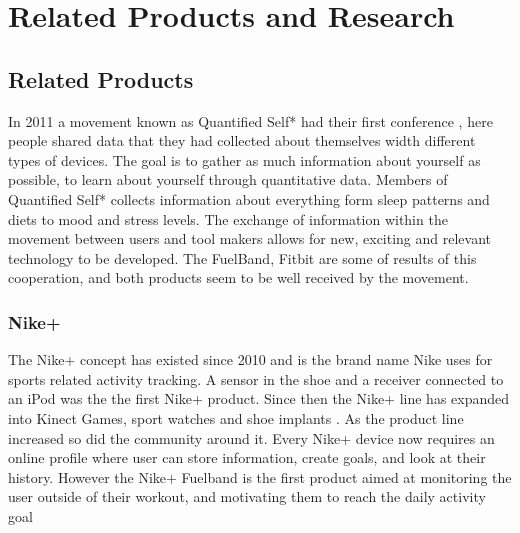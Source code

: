 \chapter{Related Products and Research} %

\label{Chapter3} %


\section{Related Products}
In 2011 a movement known as Quantified Self*\cite{quantfiedSelf} had their first conference \cite{bodyHackers}, here people shared data that they had collected about themselves width different types of devices. The goal is to gather as much information about yourself as possible, to learn about yourself through quantitative data. Members of Quantified Self* collects information about everything form sleep patterns and diets to mood and stress levels.
The exchange of information within the movement between users and tool makers %
 allows for new, exciting and relevant technology to be developed. The FuelBand\cite{fuelBand}, Fitbit\cite{fitBit} are some of results of this cooperation, and both products seem to be well received by the movement. %

\subsection{Nike+}
The Nike+ concept has existed since 2010 and is the brand name Nike uses for sports related activity tracking. A sensor in the shoe and a receiver connected to an iPod was the the first Nike+ product. Since then the Nike+ line has expanded into Kinect Games, sport watches and shoe implants \cite{nikeProducts}. As the product line increased so did the community around it. Every Nike+ device now requires an online profile where user can store information, create goals, and look at their history. However the Nike+ Fuelband \cite{fuelBand} is the first product aimed at monitoring the user outside of their workout, and motivating them to reach the daily activity goal

